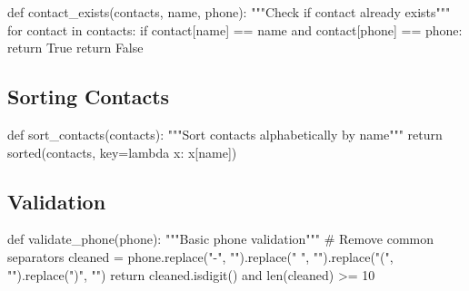 \documentclass[
  letterpaper,
  DIV=11,
  numbers=noendperiod,
  oneside]{scrreprt}
\newenvironment{Shaded}{}{}
\newcommand{\BuiltInTok}[1]{\textcolor[rgb]{0.84,0.23,0.29}{#1}}
\newcommand{\CommentTok}[1]{\textcolor[rgb]{0.42,0.45,0.49}{#1}}
\newcommand{\ControlFlowTok}[1]{\textcolor[rgb]{0.84,0.23,0.29}{#1}}
\newcommand{\DecValTok}[1]{\textcolor[rgb]{0.00,0.36,0.77}{#1}}
\newcommand{\KeywordTok}[1]{\textcolor[rgb]{0.84,0.23,0.29}{#1}}
\newcommand{\NormalTok}[1]{\textcolor[rgb]{0.14,0.16,0.18}{#1}}
\newcommand{\OperatorTok}[1]{\textcolor[rgb]{0.14,0.16,0.18}{#1}}
\newcommand{\StringTok}[1]{\textcolor[rgb]{0.01,0.18,0.38}{#1}}
\newcommand{\VariableTok}[1]{\textcolor[rgb]{0.89,0.38,0.04}{#1}}
\begin{document}
\begin{Shaded}
\begin{Highlighting}[]
\KeywordTok{def}\NormalTok{ contact\_exists(contacts, name, phone):}
    \CommentTok{"""Check if contact already exists"""}
    \ControlFlowTok{for}\NormalTok{ contact }\KeywordTok{in}\NormalTok{ contacts:}
        \ControlFlowTok{if}\NormalTok{ contact[}\StringTok{\textquotesingle{}name\textquotesingle{}}\NormalTok{] }\OperatorTok{==}\NormalTok{ name }\KeywordTok{and}\NormalTok{ contact[}\StringTok{\textquotesingle{}phone\textquotesingle{}}\NormalTok{] }\OperatorTok{==}\NormalTok{ phone:}
            \ControlFlowTok{return} \VariableTok{True}
    \ControlFlowTok{return} \VariableTok{False}
\end{Highlighting}
\end{Shaded}

\subsection{Sorting Contacts}\label{sorting-contacts}

\begin{Shaded}
\begin{Highlighting}[]
\KeywordTok{def}\NormalTok{ sort\_contacts(contacts):}
    \CommentTok{"""Sort contacts alphabetically by name"""}
    \ControlFlowTok{return} \BuiltInTok{sorted}\NormalTok{(contacts, key}\OperatorTok{=}\KeywordTok{lambda}\NormalTok{ x: x[}\StringTok{\textquotesingle{}name\textquotesingle{}}\NormalTok{])}
\end{Highlighting}
\end{Shaded}

\subsection{Validation}\label{validation}

\begin{Shaded}
\begin{Highlighting}[]
\KeywordTok{def}\NormalTok{ validate\_phone(phone):}
    \CommentTok{"""Basic phone validation"""}
    \CommentTok{\# Remove common separators}
\NormalTok{    cleaned }\OperatorTok{=}\NormalTok{ phone.replace(}\StringTok{"{-}"}\NormalTok{, }\StringTok{""}\NormalTok{).replace(}\StringTok{" "}\NormalTok{, }\StringTok{""}\NormalTok{).replace(}\StringTok{"("}\NormalTok{, }\StringTok{""}\NormalTok{).replace(}\StringTok{")"}\NormalTok{, }\StringTok{""}\NormalTok{)}
    \ControlFlowTok{return}\NormalTok{ cleaned.isdigit() }\KeywordTok{and} \BuiltInTok{len}\NormalTok{(cleaned) }\OperatorTok{\textgreater{}=} \DecValTok{10}
\end{Highlighting}
\end{Shaded}
\end{document}
